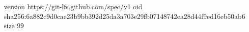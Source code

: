 version https://git-lfs.github.com/spec/v1
oid sha256:6a882c9d0cae23b9bb392d25da3a703e29fb07148742ea28d44f9ed16eb50ab6
size 99
